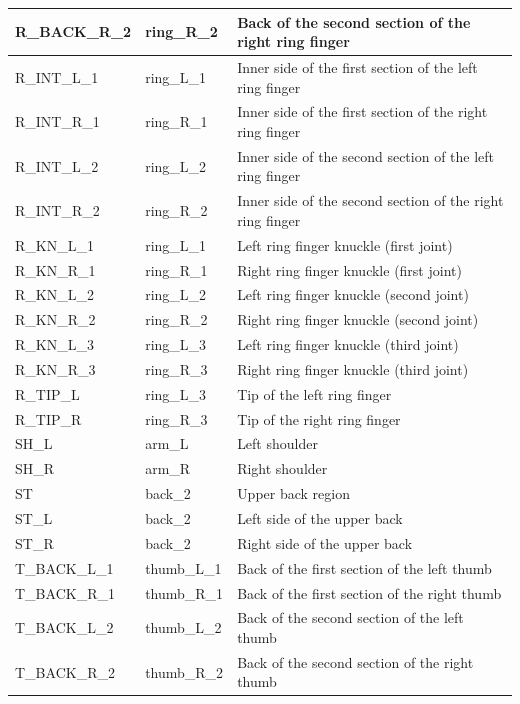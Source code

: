 \documentclass[../main.tex]{subfiles}
\begin{document}
\begin{longtable}{|p{2cm}|p{3cm}|p{5cm}|}
    R\_BACK\_R\_2 & ring\_R\_2 & Back of the second section of the right ring finger \\ \hline
    R\_INT\_L\_1 & ring\_L\_1 & Inner side of the first section of the left ring finger \\ \hline
    R\_INT\_R\_1 & ring\_R\_1 & Inner side of the first section of the right ring finger \\ \hline
    R\_INT\_L\_2 & ring\_L\_2 & Inner side of the second section of the left ring finger \\ \hline
    R\_INT\_R\_2 & ring\_R\_2 & Inner side of the second section of the right ring finger \\ \hline
    R\_KN\_L\_1 & ring\_L\_1 & Left ring finger knuckle (first joint) \\ \hline
    R\_KN\_R\_1 & ring\_R\_1 & Right ring finger knuckle (first joint) \\ \hline
    R\_KN\_L\_2 & ring\_L\_2 & Left ring finger knuckle (second joint) \\ \hline
    R\_KN\_R\_2 & ring\_R\_2 & Right ring finger knuckle (second joint) \\ \hline
    R\_KN\_L\_3 & ring\_L\_3 & Left ring finger knuckle (third joint) \\ \hline
    R\_KN\_R\_3 & ring\_R\_3 & Right ring finger knuckle (third joint) \\ \hline
    R\_TIP\_L & ring\_L\_3 & Tip of the left ring finger \\ \hline
    R\_TIP\_R & ring\_R\_3 & Tip of the right ring finger \\ \hline
    SH\_L & arm\_L & Left shoulder \\ \hline
    SH\_R & arm\_R & Right shoulder \\ \hline
    ST & back\_2 & Upper back region \\ \hline
    ST\_L & back\_2 & Left side of the upper back \\ \hline
    ST\_R & back\_2 & Right side of the upper back \\ \hline
    T\_BACK\_L\_1 & thumb\_L\_1 & Back of the first section of the left thumb \\ \hline
    T\_BACK\_R\_1 & thumb\_R\_1 & Back of the first section of the right thumb \\ \hline
    T\_BACK\_L\_2 & thumb\_L\_2 & Back of the second section of the left thumb \\ \hline
    T\_BACK\_R\_2 & thumb\_R\_2 & Back of the second section of the right thumb \\ \hline

\end{longtable}
\end{document}
